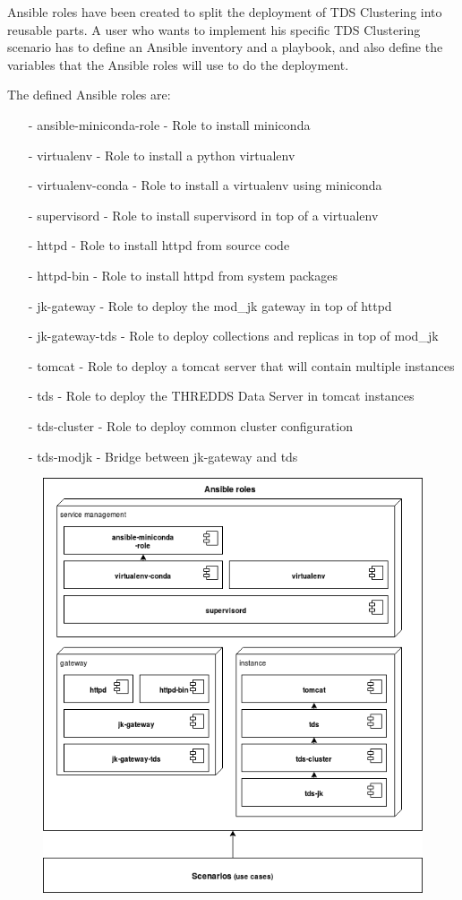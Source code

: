 \documentclass[a4paper,12pt]{article}
\begin{document}
Ansible roles have been created to split the deployment of TDS Clustering into reusable parts. A user who wants to implement his specific TDS Clustering scenario has to define an Ansible inventory and a playbook, and also define the variables that the Ansible roles will use to do the deployment.

The defined Ansible roles are:

\begin{itemize}
\item[-] ansible-miniconda-role - Role to install miniconda
\item[-] virtualenv - Role to install a python virtualenv
\item[-] virtualenv-conda - Role to install a virtualenv using miniconda
\item[-] supervisord - Role to install supervisord in top of a virtualenv
\item[-] httpd - Role to install httpd from source code
\item[-] httpd-bin - Role to install httpd from system packages
\item[-] jk-gateway - Role to deploy the mod\_jk gateway in top of httpd
\item[-] jk-gateway-tds - Role to deploy collections and replicas in top of mod\_jk
\item[-] tomcat - Role to deploy a tomcat server that will contain multiple instances
\item[-] tds - Role to deploy the THREDDS Data Server in tomcat instances
\item[-] tds-cluster - Role to deploy common cluster configuration
\item[-] tds-modjk - Bridge between jk-gateway and tds
\end{itemize}

\begin{figure}[h]
\includegraphics[width=1\textwidth]{images/roles.png}
\end{figure}
\end{document}
